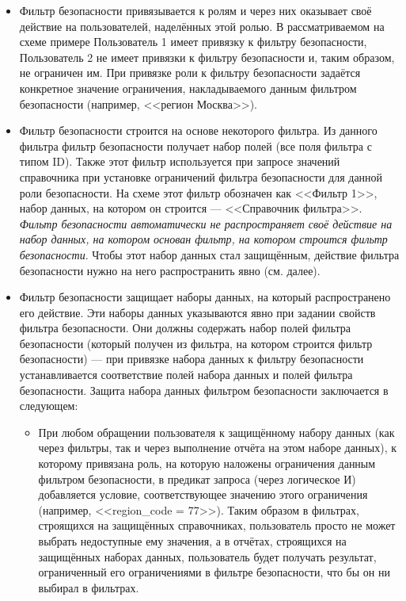 \documentclass[../user-manual.tex]{subfiles}
\begin{document}
	\begin{itemize}
		\item Фильтр безопасности привязывается к ролям и через них оказывает своё действие на пользователей, наделённых этой ролью. В рассматриваемом на схеме примере Пользователь 1 имеет привязку к фильтру безопасности, Пользователь 2 не имеет привязки к фильтру безопасности и, таким образом, не ограничен им. При привязке роли к фильтру безопасности задаётся конкретное значение ограничения, накладываемого данным фильтром безопасности (например, <<регион Москва>>).
		
		\item Фильтр безопасности строится на основе некоторого фильтра. Из данного фильтра фильтр безопасности получает набор полей (все поля фильтра с типом ID). Также этот фильтр используется при запросе значений справочника при установке ограничений фильтра безопасности для данной роли безопасности. На схеме этот фильтр обозначен как <<Фильтр 1>>, набор данных, на котором он строится --- <<Справочник фильтра>>. \textit{Фильтр безопасности автоматически не распространяет своё действие на набор данных, на котором основан фильтр, на котором строится фильтр безопасности}. Чтобы этот набор данных стал защищённым, действие фильтра безопасности нужно на него распространить явно (см. далее).
		
		\item Фильтр безопасности защищает наборы данных, на который распространено его действие. Эти наборы данных указываются явно при задании свойств фильтра безопасности. Они должны содержать набор полей фильтра безопасности (который получен из фильтра, на котором строится фильтр безопасности) --- при привязке набора данных к фильтру безопасности устанавливается соответствие полей набора данных и полей фильтра безопасности. Защита набора данных фильтром безопасности заключается в следующем:
			\begin{itemize}
				\item При любом обращении пользователя к защищённому набору данных (как через фильтры, так и через выполнение отчёта на этом наборе данных), к которому привязана роль, на которую наложены ограничения данным фильтром безопасности,  в предикат запроса (через логическое И) добавляется условие, соответствующее значению этого ограничения (например, <<region\_code = 77>>). Таким образом в фильтрах, строящихся на защищённых справочниках, пользователь просто не может выбрать недоступные ему значения, а в отчётах, строящихся на защищённых наборах данных, пользователь будет получать результат, ограниченный его ограничениями в фильтре безопасности, что бы он ни выбирал в фильтрах.
				

\end{itemize}
\end{itemize}
\end{document}
